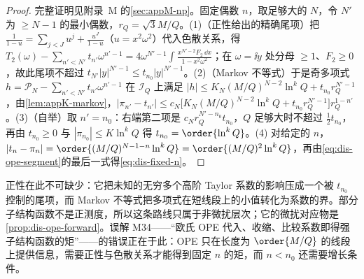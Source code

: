 \begin{proof}
完整证明见附录~M 的\cref{sec:appM-np}。固定偶数 $n$，取足够大的 $N$，令 $N'$ 为 $\ge N-1$ 的最小偶数，$r_Q=\sqrt3M/Q$。(1)（正性给出的精确尾项）把 $\frac1{1-u}=\sum_{j<J}u^j+\frac{u^J}{1-u}$（$u=x^2\omega^2$）代入色散关系，得 $T_2(\omega)-\sum_{n'<N'}t_{n'}\omega^{n'-1}=4\omega^{N'-1}\int\frac{x^{N'-2}F_2\,\dd x}{1-x^2\omega^2}$；在 $\omega=\ii y$ 处分母 $\ge1$、$F_2\ge0$，故此尾项不超过 $t_{N'}|y|^{N'-1}\le t_{n_0}|y|^{N'-1}$。(2)（Markov 不等式）于是奇多项式 $h=\mathcal P_N-\sum_{n'<N'}t_{n'}\omega^{n'-1}$ 在 $\mathcal I_Q$ 上满足 $|h|\le K_N(M/Q)^{N-2}\ln^kQ+t_{n_0}r_Q^{N'-1}$，由\cref{lem:appK-markov}，$|\pi_{n'}-t_{n'}|\le c_N\big[K_N(M/Q)^{N-2}\ln^kQ+t_{n_0}r_Q^{N'-1}\big]r_Q^{1-n'}$。(3)（自举）取 $n'=n_0$：右端第二项是 $c_Nr_Q^{N'-n_0}t_{n_0}$，$Q$ 足够大时不超过 $\frac12t_{n_0}$，再由 $t_{n_0}\ge0$ 与 $|\pi_{n_0}|\le K\ln^kQ$ 得 $t_{n_0}=\order{\ln^kQ}$。(4) 对给定的 $n$，$|t_n-\pi_n|=\order{(M/Q)^{N-1-n}\ln^kQ}=\order{(M/Q)^2\ln^kQ}$，再由\cref{eq:dis-ope-segment}的最后一式得\cref{eq:dis-fixed-n}。
\end{proof}

正性在此不可缺少：它把未知的无穷多个高阶 Taylor 系数的影响压成一个被 $t_{n_0}$ 控制的尾项，而 Markov 不等式把多项式在短线段上的小值转化为系数的界。部分子结构函数不是正测度，所以这条路线只属于非微扰层次；它的微扰对应物是\cref{prop:dis-ope-forward}。误解 M34——“欧氏 OPE 代入、收缩、比较系数即得强子结构函数的矩”——的错误正在于此：OPE 只在长度为 $\order{M/Q}$ 的线段上提供信息，需要正性与色散关系才能得到固定 $n$ 的矩，而 $n<n_0$ 还需要增长条件。

